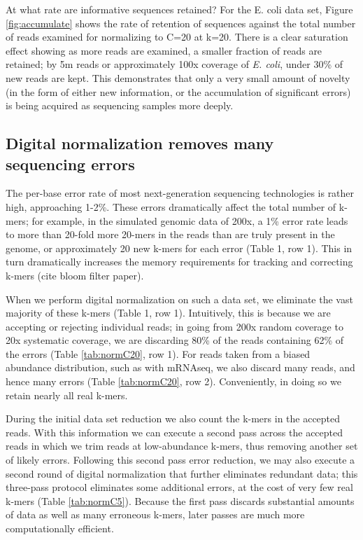 \documentclass[10pt]{article}
\begin{document}
At what rate are informative sequences retained?  For the E. coli data
set, Figure \ref{fig:accumulate} shows the rate of retention of
sequences against the total number of reads examined for normalizing
to C=20 at k=20.  There is a clear saturation effect showing as more
reads are examined, a smaller fraction of reads are retained; by 5m
reads or approximately 100x coverage of {\em E. coli}, under 30\% of
new reads are kept.  This demonstrates that only a very small amount
of novelty (in the form of either new information, or the accumulation
of significant errors) is being acquired as sequencing samples more
deeply.

\subsection*{Digital normalization removes many sequencing errors}

The per-base error rate of most next-generation sequencing technologies
is rather high, approaching 1-2\%.  
These
errors dramatically affect the total number of k-mers; for example, in the
simulated genomic data of 200x, a 1\% error rate leads to more than
20-fold more 20-mers in the reads than are truly present in the genome,
or approximately 20 new k-mers for each error (Table 1, row 1).
This in turn dramatically increases the memory requirements for
tracking and correcting k-mers (cite bloom filter paper).

When we perform digital normalization on such a data set, we eliminate
the vast majority of these k-mers (Table 1, row 1).  Intuitively, this is
because we are accepting or rejecting individual reads; in going from
200x random coverage to 20x systematic coverage, we are discarding
80\% of the reads containing 62\% of the errors (Table \ref{tab:normC20}, row 1).
For reads taken from a biased abundance distribution, such as with
mRNAseq, we also discard many reads, and hence many errors (Table \ref{tab:normC20}, row 2).
Conveniently, in doing so we retain nearly all real k-mers.

During the initial data set reduction we also count the k-mers in the
accepted reads.  With this information we can execute a second pass
across the accepted reads in which we trim reads at low-abundance
k-mers, thus removing another set of likely errors.  Following this
second pass error reduction, we may also execute a second round of
digital normalization that further eliminates redundant data; this
three-pass protocol eliminates some additional errors, at the cost
of very few real k-mers (Table \ref{tab:normC5}).  Because the first
pass discards substantial amounts of data as well as many erroneous
k-mers, later passes are much more computationally efficient.
\end{document}
